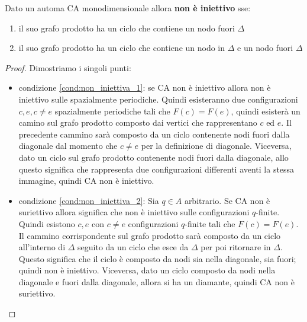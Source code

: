 \begin{teorema}
    Dato un automa CA monodimensionale allora \textbf{non è iniettivo} sse:
    \begin{enumerate}
        \item \label{cond:non_iniettiva_1} il suo grafo prodotto ha un ciclo che contiene un nodo fuori $\Delta$
        \item \label{cond:non_iniettiva_2}il suo grafo prodotto ha un ciclo che contiene un nodo in $\Delta$ e
              un nodo fuori $\Delta$
    \end{enumerate}
    \begin{proof}
        Dimostriamo i singoli punti:
        \begin{itemize}
            \item condizione \ref{cond:non_iniettiva_1}: se CA non è iniettivo
                  allora non è iniettivo sulle spazialmente periodiche. Quindi esisteranno
                  due configurazioni $c,e, c\ne e$ spazialmente periodiche tali che $F(c) = F(e)$,
                  quindi esisterà un camino sul grafo prodotto composto dai vertici che
                  rappresentano $c$ ed $e$. Il precedente cammino sarà composto da un ciclo
                  contenente nodi fuori dalla diagonale dal momento che $c\ne e$ per la
                  definizione di diagonale. Viceversa, dato un ciclo sul grafo prodotto contenente nodi
                  fuori dalla diagonale, allo questo significa che rappresenta due
                  configurazioni differenti aventi la stessa immagine, quindi CA non è
                  iniettivo.
            \item condizione \ref{cond:non_iniettiva_2}: Sia $q\in A$ arbitrario.
                  Se CA non è suriettivo allora significa che non è iniettivo sulle
                  configurazioni $q$-finite. Quindi esistono $c,e$ con $c\ne e $ configurazioni
                  $q$-finite tali che $F(c) =F(e)$. Il cammino corrispondente sul
                  grafo prodotto sarà composto da un ciclo all'interno di $\Delta$
                  seguito da un ciclo che esce da $\Delta$ per poi ritornare in $\Delta$.
                  Questo significa che il ciclo è composto da nodi sia nella diagonale,
                  sia fuori; quindi non è iniettivo. Viceversa, dato un ciclo composto da nodi nella diagonale
                  e fuori dalla diagonale, allora si ha un diamante, quindi CA non è suriettivo.

        \end{itemize}
    \end{proof}
\end{teorema}

